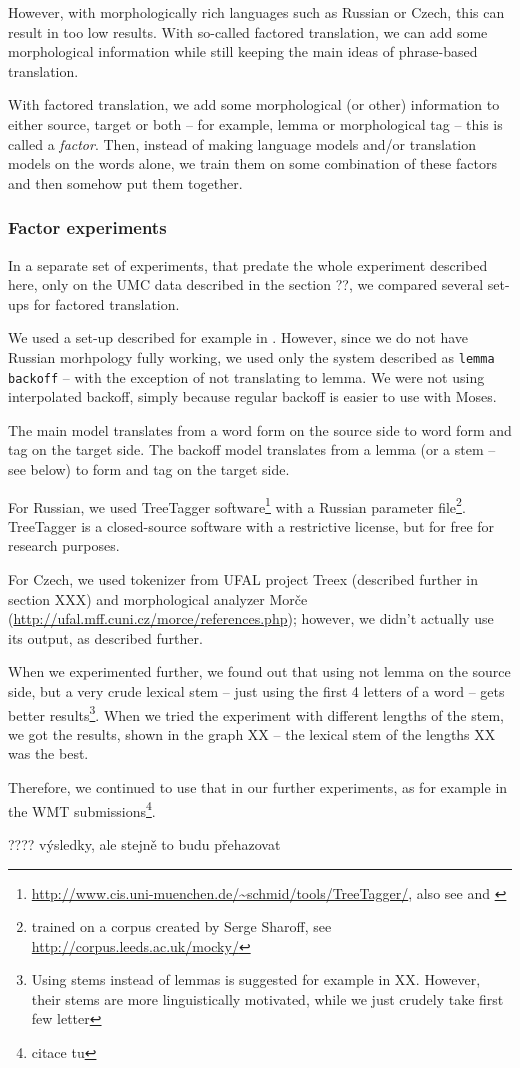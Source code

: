 However, with morphologically rich languages such as Russian or Czech, this can result in too low results. With so-called factored translation, we can add some morphological information while still keeping the main ideas of phrase-based translation.

With factored translation, we add some morphological (or other) information to either source, target or both -- for example, lemma or morphological tag -- this is called a \emph{factor}. Then, instead of making language models and/or translation models on the words alone, we train them on some combination of these factors and then somehow put them together.

\subsubsection{Factor experiments}
In a separate set of experiments, that predate the whole experiment described here, only on the UMC data described in the section ??, we compared several set-ups for factored translation.

We used a set-up described for example in \cite{backoff}. However, since we do not have Russian morhpology fully working, we used only the system described as \texttt{lemma backoff} -- with the exception of not translating to lemma. We were not using interpolated backoff, simply because regular backoff is easier to use with Moses.

The main model translates from a word form on the source side to word form and tag on the target side. The backoff model translates from a lemma (or a stem -- see below) to form and tag on the target side.

For Russian, we used TreeTagger software\footnote{\url{http://www.cis.uni-muenchen.de/~schmid/tools/TreeTagger/}, also see \cite{treetagger1} and \cite{treetagger2}} with a Russian parameter file\footnote{trained on a corpus created by Serge Sharoff, see \url{http://corpus.leeds.ac.uk/mocky/}}. TreeTagger is a closed-source software with a restrictive license, but for free for research purposes.

For Czech, we used tokenizer from UFAL project Treex (described further in section XXX) and morphological analyzer Morče (\url{http://ufal.mff.cuni.cz/morce/references.php}); however, we didn't actually use its output, as described further.

When we experimented further, we found out that using not lemma on the source side, but a very crude lexical stem -- just using the first 4 letters of a word -- gets better results\footnote{Using stems instead of lemmas is suggested for example in XX. However, their stems are more linguistically motivated, while we just crudely take first few letter}. When we tried the experiment with different lengths of the stem, we got the results, shown in the graph XX -- the lexical stem of the lengths XX was the best.

Therefore, we continued to use that in our further experiments, as for example in the WMT submissions\footnote{citace tu}.




???? výsledky, ale stejně to budu přehazovat









